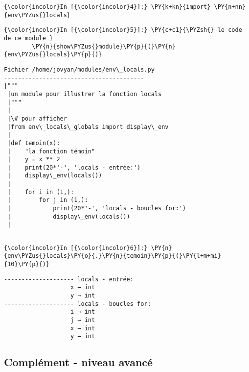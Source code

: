     \begin{Verbatim}[commandchars=\\\{\}]
{\color{incolor}In [{\color{incolor}4}]:} \PY{k+kn}{import} \PY{n+nn}{env\PYZus{}locals}
\end{Verbatim}


    \begin{Verbatim}[commandchars=\\\{\}]
{\color{incolor}In [{\color{incolor}5}]:} \PY{c+c1}{\PYZsh{} le code de ce module }
        \PY{n}{show\PYZus{}module}\PY{p}{(}\PY{n}{env\PYZus{}locals}\PY{p}{)}
\end{Verbatim}


    \begin{Verbatim}[commandchars=\\\{\}]
Fichier /home/jovyan/modules/env\_locals.py
----------------------------------------
|"""
 |un module pour illustrer la fonction locals
 |"""
 |
 |\# pour afficher
 |from env\_locals\_globals import display\_env
 |
 |def temoin(x):
 |    "la fonction témoin"
 |    y = x ** 2
 |    print(20*'-', 'locals - entrée:')
 |    display\_env(locals())
 |
 |    for i in (1,):
 |        for j in (1,):
 |            print(20*'-', 'locals - boucles for:')
 |            display\_env(locals())
 |            
 
    \end{Verbatim}

    \begin{Verbatim}[commandchars=\\\{\}]
{\color{incolor}In [{\color{incolor}6}]:} \PY{n}{env\PYZus{}locals}\PY{o}{.}\PY{n}{temoin}\PY{p}{(}\PY{l+m+mi}{10}\PY{p}{)}
\end{Verbatim}


    \begin{Verbatim}[commandchars=\\\{\}]
-------------------- locals - entrée:
                   x → int
                   y → int
-------------------- locals - boucles for:
                   i → int
                   j → int
                   x → int
                   y → int

    \end{Verbatim}

    \hypertarget{compluxe9ment---niveau-avancuxe9}{%
\subsection{Complément - niveau
avancé}\label{compluxe9ment---niveau-avancuxe9}}

